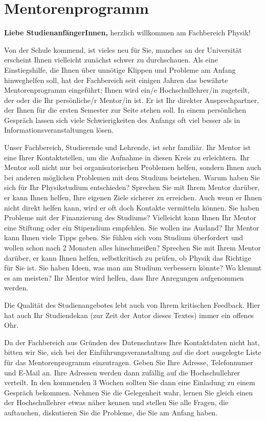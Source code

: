 \section{Mentorenprogramm}
\textbf{Liebe StudienanfängerInnen,}
\medskip
herzlich willkommen am Fachbereich Physik!

Von der Schule kommend, ist vieles neu für Sie, manches an der Universität erscheint Ihnen vielleicht zunächst schwer zu durchschauen. Als eine Einstiegshilfe, die Ihnen über unnötige
Klippen und Probleme am Anfang hinweghelfen soll, hat der Fachbereich seit einigen Jahren das bewährte Mentorenprogramm eingeführt; Ihnen wird ein/e Hochschullehrer/in zugeteilt,
der oder die Ihr persönliche/r Mentor/in ist. Er ist Ihr direkter Ansprechpartner, der Ihnen für die ersten Semester zur Seite stehen soll. In einem persönlichen Gespräch lassen sich viele Schwierigkeiten des Anfangs oft viel besser als in Informationsveranstaltungen lösen.

Unser Fachbereich, Studierende und Lehrende, ist sehr familiär. Ihr Mentor ist eine Ihrer Kontaktstellen, um die Aufnahme in diesen Kreis zu erleichtern. Ihr Mentor soll nicht nur bei organisatorischen Problemen helfen, sondern Ihnen auch bei anderen möglichen Problemen mit dem Studium beistehen. Warum haben Sie sich für Ihr Physikstudium entschieden? Sprechen Sie mit Ihrem Mentor darüber, er kann Ihnen helfen, Ihre eigenen Ziele sicherer zu erreichen. Auch wenn er Ihnen nicht direkt helfen kann, wird er oft doch Kontakte vermitteln können. Sie haben Probleme mit der Finanzierung des Studiums? Vielleicht kann Ihnen Ihr Mentor eine Stiftung oder ein Stipendium empfehlen. Sie wollen ins Ausland? Ihr Mentor kann Ihnen viele Tipps geben. Sie fühlen sich vom Studium überfordert und wollen schon nach 2 Monaten alles
hinschmeißen? Sprechen Sie mit Ihrem Mentor darüber, er kann Ihnen helfen, selbstkritisch zu prüfen, ob Physik das Richtige für Sie ist. Sie haben Ideen, was man am Studium verbessern
könnte? Wo klemmt es am meisten? Ihr Mentor wird helfen, dass Ihre Anregungen aufgenommen werden.

Die Qualität des Studienangebotes lebt auch von Ihrem kritischen Feedback. Hier hat auch Ihr Studiendekan (zur Zeit der Autor dieses Textes) immer ein offenes Ohr.

Da der Fachbereich aus Gründen des Datenschutzes Ihre Kontaktdaten nicht hat, bitten wir Sie, sich bei der Einführungsveranstaltung auf die dort ausgelegte Liste für das Mentorenprogramm einzutragen. Geben Sie Ihre Adresse, Telefonnumer und E-Mail an. Ihre Adressen werden dann
zufällig auf die Hochschullehrer verteilt. In den kommenden 3 Wochen sollten Sie dann eine Einladung zu einem Gespräch bekommen. Nehmen Sie die Gelegenheit wahr, lernen Sie gleich
einen der Hochschullehrer etwas näher kennen und stellen Sie alle Fragen, die auftauchen, diskutieren Sie die Probleme, die Sie am Anfang haben.

